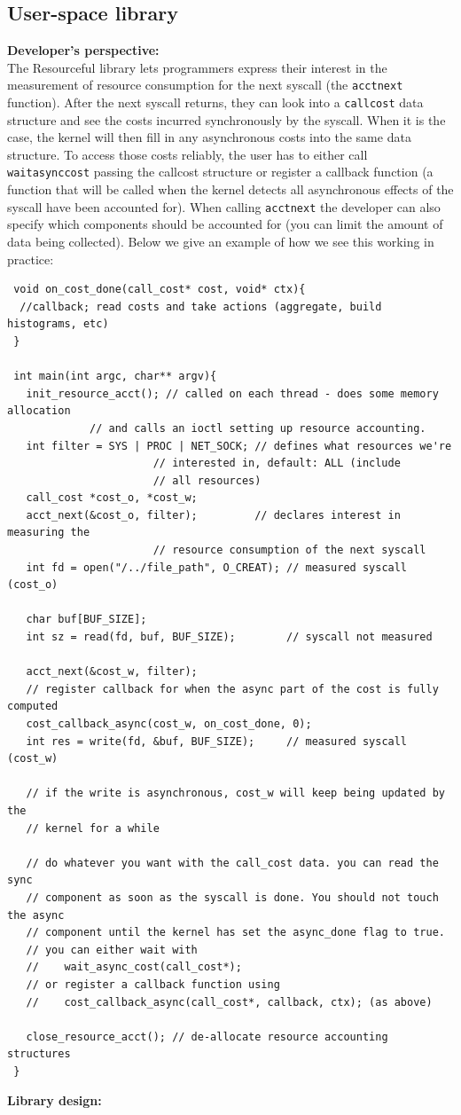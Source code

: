 \documentclass[12pt]{article}
\def\_{\textunderscore\-}
\begin{document}
\subsection{User-space library}
\textbf{Developer’s perspective:\\}
The Resourceful library lets programmers express their interest in the measurement of resource consumption for the next syscall (the \texttt{acct\_next} function). After the next syscall returns, they can look into a \texttt{call\_cost} data structure and see the costs incurred synchronously by the syscall. When it is the case, the kernel will then fill in any asynchronous costs into the same data structure. To access those costs reliably, the user has to either call \texttt{wait\_async\_cost} passing the call\_cost structure or register a callback function (a function that will be called when the kernel detects all asynchronous effects of the syscall have been accounted for).
When calling \texttt{acct\_next} the developer can also specify which components should be accounted for (you can limit the amount of data being collected). Below we give an example of how we see this working in practice:


\lstset{style=customc}
\begin{lstlisting}
 void on_cost_done(call_cost* cost, void* ctx){
  //callback; read costs and take actions (aggregate, build histograms, etc)
 }

 int main(int argc, char** argv){
   init_resource_acct(); // called on each thread - does some memory allocation
			 // and calls an ioctl setting up resource accounting.
   int filter = SYS | PROC | NET_SOCK; // defines what resources we're
				       // interested in, default: ALL (include
				       // all resources)
   call_cost *cost_o, *cost_w;
   acct_next(&cost_o, filter);         // declares interest in measuring the
				       // resource consumption of the next syscall
   int fd = open("/../file_path", O_CREAT); // measured syscall (cost_o)

   char buf[BUF_SIZE];
   int sz = read(fd, buf, BUF_SIZE);        // syscall not measured

   acct_next(&cost_w, filter);
   // register callback for when the async part of the cost is fully computed
   cost_callback_async(cost_w, on_cost_done, 0);
   int res = write(fd, &buf, BUF_SIZE);     // measured syscall (cost_w)

   // if the write is asynchronous, cost_w will keep being updated by the
   // kernel for a while

   // do whatever you want with the call_cost data. you can read the sync
   // component as soon as the syscall is done. You should not touch the async
   // component until the kernel has set the async_done flag to true.
   // you can either wait with
   //    wait_async_cost(call_cost*);
   // or register a callback function using
   //    cost_callback_async(call_cost*, callback, ctx); (as above)

   close_resource_acct(); // de-allocate resource accounting structures
 }
 \end{lstlisting}
  \textbf{Library design:\\}
\end{document}
